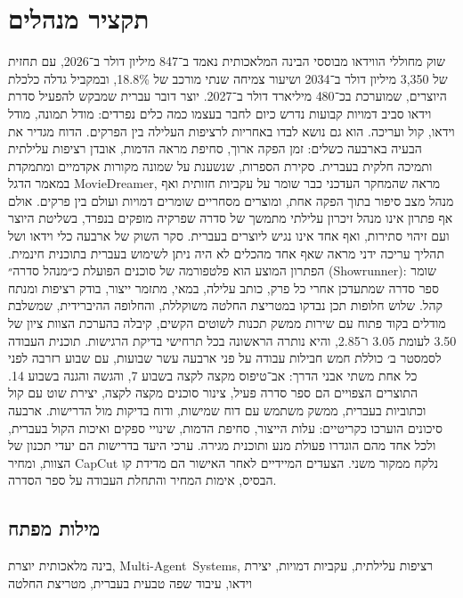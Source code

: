 \chapter*{תקציר מנהלים}

שוק מחוללי הווידאו מבוססי הבינה המלאכותית נאמד ב־847 מיליון דולר ב־2026, עם תחזית של 3,350 מיליון דולר ב־2034 ושיעור צמיחה שנתי מורכב של 18.8\%, ובמקביל גדלה כלכלת היוצרים, שמוערכת בכ־480 מיליארד דולר ב־2027. יוצר דובר עברית שמבקש להפעיל סדרת וידאו סביב דמויות קבועות נדרש כיום לחבר בעצמו כמה כלים נפרדים: מודל תמונה, מודל וידאו, קול ועריכה. הוא גם נושא לבדו באחריות לרציפות העלילה בין הפרקים. הדוח מגדיר את הבעיה בארבעה כשלים: זמן הפקה ארוך, סחיפת מראה הדמות, אובדן רציפות עלילתית ותמיכה חלקית בעברית. סקירת הספרות, שנשענת על שמונה מקורות אקדמיים ומתמקדת במאמר הדגל \textenglish{MovieDreamer}, מראה שהמחקר העדכני כבר שומר על עקביות חזותית ואף מנהל מצב סיפור בתוך הפקה אחת, ומוצרים מסחריים שומרים דמויות ועולם בין פרקים. אולם אף פתרון אינו מנהל זיכרון עלילתי מתמשך של סדרה שפרקיה מופקים בנפרד, בשליטת היוצר ועם זיהוי סתירות, ואף אחד אינו נגיש ליוצרים בעברית. סקר השוק של ארבעה כלי וידאו ושל תהליך עריכה ידני מראה שאף אחד מהכלים לא היה ניתן לשימוש בעברית בתוכנית חינמית. הפתרון המוצע הוא פלטפורמה של סוכנים הפועלת כ״מנהל סדרה״ (\textenglish{Showrunner}): שומר ספר סדרה שמתעדכן אחרי כל פרק, כותב עלילה, במאי, מתזמר ייצור, בודק רציפות ומנתח קהל. שלוש חלופות תכן נבדקו במטריצת החלטה משוקללת, והחלופה ההיברידית, שמשלבת מודלים בקוד פתוח עם שירות ממשק תכנות לשוטים הקשים, קיבלה בהערכת הצוות ציון של 3.50 לעומת 3.05 ו־2.85, והיא נותרה הראשונה בכל תרחישי בדיקת הרגישות. תוכנית העבודה לסמסטר ב׳ כוללת חמש חבילות עבודה על פני ארבעה עשר שבועות, עם שבוע רזרבה לפני כל אחת משתי אבני הדרך: אב־טיפוס מקצה לקצה בשבוע 7, והגשה והגנה בשבוע 14. התוצרים הצפויים הם ספר סדרה פעיל, צינור סוכנים מקצה לקצה, יצירת שוט עם קול וכתוביות בעברית, ממשק משתמש עם דוח שמישות, ודוח בדיקות מול הדרישות. ארבעה סיכונים הוערכו כקריטיים: עלות הייצור, סחיפת הדמות, שינויי ספקים ואיכות הקול בעברית, ולכל אחד מהם הוגדרו פעולת מנע ותוכנית מגירה. ערכי היעד בדרישות הם יעדי תכנון של הצוות, ומחיר \textenglish{CapCut} נלקח ממקור משני. הצעדים המיידיים לאחר האישור הם מדידת קו הבסיס, אימות המחיר והתחלת העבודה על ספר הסדרה.

\section*{מילות מפתח}
בינה מלאכותית יוצרת, \mbox{\textenglish{Multi-Agent Systems}}, רציפות עלילתית, עקביות דמויות, יצירת וידאו, עיבוד שפה טבעית בעברית, מטריצת החלטה
